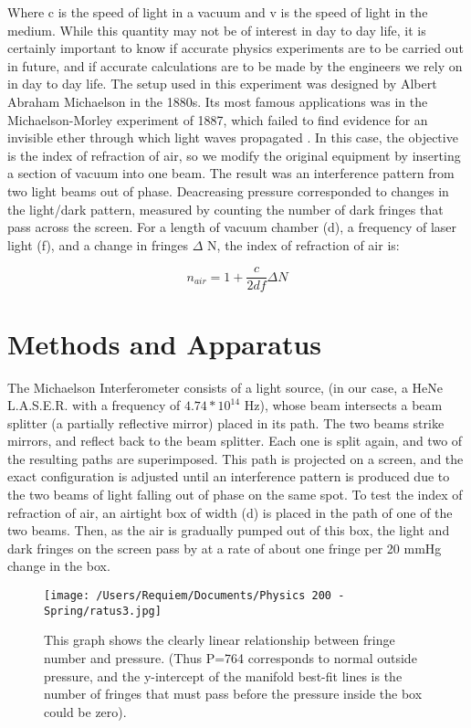 \documentclass[aps,pre,twocolumn,nofootinbib]{revtex4}
\begin{document}
Where c is the speed of light in a vacuum and v is the speed of light in the medium.  While this quantity may not be of interest in day to day life, it is certainly important to know if accurate physics experiments are to be carried out in future, and if accurate calculations are to be made by the engineers we rely on in day to day life.  The setup used in this experiment was designed by Albert Abraham Michaelson in the 1880s.  Its most famous applications was in the Michaelson-Morley experiment of 1887, which failed to find evidence for an invisible ether through which light waves propagated \cite{Scribner2008}.  In this case, the objective is the index of refraction of air, so we modify the original equipment by inserting a section of vacuum into one beam.  The result was an interference pattern from two light beams out of phase.  Deacreasing pressure corresponded to changes in the light/dark pattern, measured by counting the number of dark fringes that pass across the screen.  For a length of vacuum chamber (d), a frequency of laser light (f), and a change in fringes $\Delta$ N, the index of refraction of air is:  

\begin{equation}
\label{nofair}
n_{air}=1+\frac{c}{2df} \Delta N
\end{equation}



\section{Methods and Apparatus}
The Michaelson Interferometer consists of a light source, (in our case, a HeNe L.A.S.E.R. with a  frequency of $4.74*10^{14}$ Hz), whose beam intersects a beam splitter (a partially reflective mirror) placed in its path.  The two beams strike mirrors, and reflect back to the beam splitter.  Each one is split again, and two of the resulting paths are superimposed.  This path is projected on a screen, and the exact configuration is adjusted until an interference pattern is produced due to the two beams of light falling out of phase on the same spot.  To test the index of refraction of air, an airtight box of width (d) is placed in the path of one of the two beams.  Then, as the air is gradually pumped out of this box, the light and dark fringes  on the screen pass by at a rate of about one fringe per 20 mmHg change in the box.  


\begin{figure}[h]
\centering
\texttt{[image: /Users/Requiem/Documents/Physics 200 - Spring/ratus3.jpg]} 
\caption{This graph shows the clearly linear relationship between fringe number and pressure.  (Thus P=764 corresponds to normal outside pressure, and the y-intercept of the manifold best-fit lines is the number of fringes that must pass before the pressure inside the box could be zero).  }
\label{ratus}
\end{figure}
\end{document}
